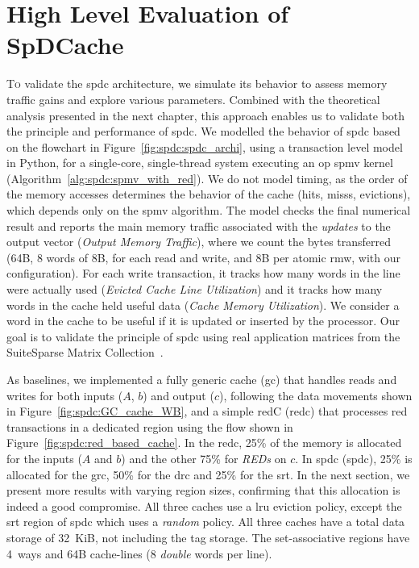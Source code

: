 
\section{High Level Evaluation of SpDCache}
\label{sec:spdc:eval}

\lettrine{T}{o} validate the \acrlong{spdc} architecture, we simulate its behavior to assess memory traffic gains and explore various parameters.
Combined with the theoretical analysis presented in the next chapter, this approach enables us to validate both the principle and performance of \acrlong{spdc}.
We modelled the behavior of \acrlong{spdc} based on the flowchart in Figure~\ref{fig:spdc:spdc_archi}, using a transaction level model in Python, for a single-core, single-thread system executing an \acrshort{op} \acrshort{spmv} kernel (Algorithm~\ref{alg:spdc:spmv_with_red}).
We do not model timing, as the order of the memory accesses determines the behavior of the cache (\glspl{hit}, \glspl{miss}, \glspl{eviction}), which depends only on the \acrshort{spmv} algorithm.
The model checks the final numerical result and reports the main memory traffic associated with the \emph{updates} to the output vector (\emph{Output Memory Traffic}), where we count the bytes transferred (64B, 8 words of 8B, for each read and write, and 8B per atomic \acrshort{rmw}, with our configuration).
For each write transaction, it tracks how many words in the line were actually used (\emph{Evicted Cache Line Utilization}) and it tracks how many words in the cache held useful data (\emph{Cache Memory Utilization}).
We consider a word in the cache to be useful if it is updated or inserted by the processor.
Our goal is to validate the principle of \acrlong{spdc} using real application matrices from the SuiteSparse Matrix Collection~\cite{Kolodziej2019_SuiteSparse}.

As baselines, we implemented a fully generic cache (\acrshort{gc}) that handles reads and writes for both inputs ($A$, $b$) and output ($c$), following the data movements shown in Figure~\ref{fig:spdc:GC_cache_WB}, and a simple \gls{redC} (\acrshort{redc}) that processes \acrshort{red} transactions in a dedicated region using the flow shown in Figure~\ref{fig:spdc:red_based_cache}.
In the \acrshort{redc}, 25\% of the memory is allocated for the inputs ($A$ and $b$) and the other 75\% for \emph{REDs} on $c$.
In \acrlong{spdc} (\acrshort{spdc}), 25\% is allocated for the \acrshort{grc}, 50\% for the \acrshort{drc} and 25\% for the \acrshort{srt}.
In the next section, we present more results with varying region sizes, confirming that this allocation is indeed a good compromise.
All three caches use a \acrfull{lru} \gls{eviction} policy, except the \acrshort{srt} region of \acrlong{spdc} which uses a \emph{random} policy.
All three caches have a total data storage of 32~KiB, not including the \gls{tag} storage.
The \gls{set}-associative regions have 4~\glspl{way} and 64B cache-lines (8 \emph{double} words per line).


